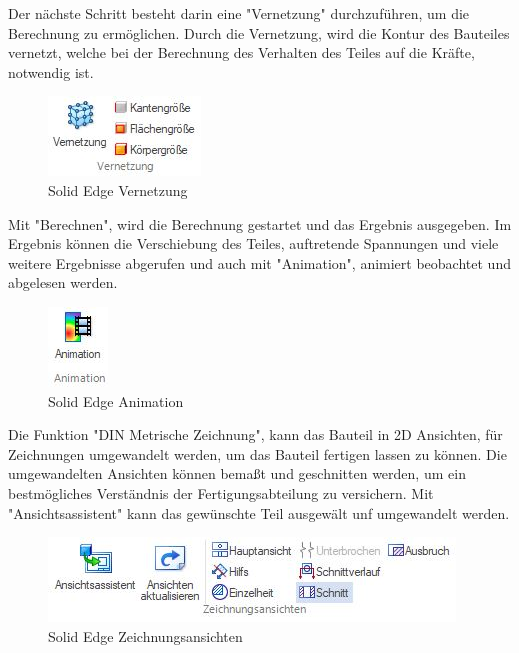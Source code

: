 Der nächste Schritt besteht darin eine "Vernetzung" durchzuführen, um die Berechnung zu ermöglichen. Durch die Vernetzung, wird die Kontur des Bauteiles vernetzt, welche bei der Berechnung des Verhalten des Teiles auf die Kräfte, notwendig ist. 


\begin{figure} [H]
	\begin{center}
		\includegraphics[scale=0.4]{figures/mechanik/Solid Edge_Vernetzung.jpg}
			\caption{Solid Edge Vernetzung}
			\label{fig:Solid Edge Vernetzung}
	\end{center}
\end{figure}


Mit "Berechnen", wird die Berechnung gestartet und das Ergebnis ausgegeben.
Im Ergebnis können die Verschiebung des Teiles, auftretende Spannungen und viele weitere Ergebnisse abgerufen und auch mit "Animation", animiert beobachtet und abgelesen werden. 


\begin{figure} [H]
	\begin{center}
		\includegraphics[scale=0.4]{figures/mechanik/Solid Edge_Animation.jpg}
			\caption{Solid Edge Animation}
			\label{fig:Solid Edge Animation}
	\end{center}
\end{figure}


Die Funktion "DIN Metrische Zeichnung", kann das Bauteil in 2D Ansichten, für Zeichnungen umgewandelt werden, um das Bauteil fertigen lassen zu können. Die umgewandelten Ansichten können bemaßt und geschnitten werden, um ein bestmögliches Verständnis der Fertigungsabteilung zu versichern. Mit "Ansichtsassistent" kann das gewünschte Teil ausgewält unf umgewandelt werden.


\begin{figure} [H]
	\begin{center}
		\includegraphics[scale=0.4]{figures/mechanik/Solid Edge_Zeichnungsansichten.jpg}
			\caption{Solid Edge Zeichnungsansichten}
			\label{fig:Solid Edge Zeichnungsansichten}
	\end{center}
\end{figure}


